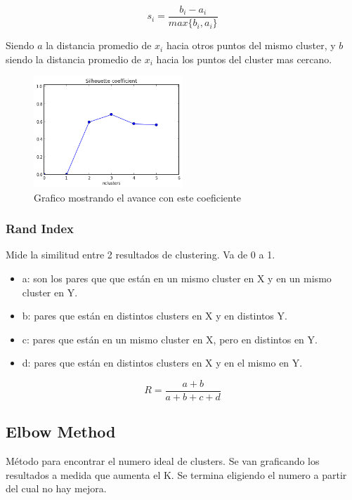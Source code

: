 \documentclass[titlepage,a4paper]{article}
\begin{document}
\begin{equation}
    s_i = \frac{b_i - a_i}{max\{b_i,a_i\}}
\end{equation}

Siendo $a$ la distancia promedio de $x_i$ hacia otros puntos del mismo cluster, y $b$ siendo la distancia promedio de $x_i$ hacia los puntos del cluster mas cercano.

\begin{figure}[!htb]
    \centering
    \includegraphics[width=0.5\textwidth]{imagenesResumen/SilhouetteCoef.png}
    \caption{Grafico mostrando el avance con este coeficiente}
\end{figure}

\newpage

\subsubsection{Rand Index}

Mide la similitud entre 2 resultados de clustering. Va de 0 a 1.

\begin{itemize}
    \item a: son los pares que que están en un mismo cluster en X y en un mismo cluster en Y.
    \item b: pares que están en distintos clusters en X y en distintos Y.
    \item c: pares que están en un mismo cluster en X, pero en distintos en Y.
    \item d: pares que están en distintos clusters en X y en el mismo en Y.
\end{itemize}

\begin{equation}
    R = \frac{a+b}{a+b+c+d}
\end{equation}

\subsection{Elbow Method}
Método para encontrar el numero ideal de clusters. Se van graficando los resultados a medida que aumenta el K. Se termina eligiendo el numero a partir del cual no hay mejora.
\end{document}
